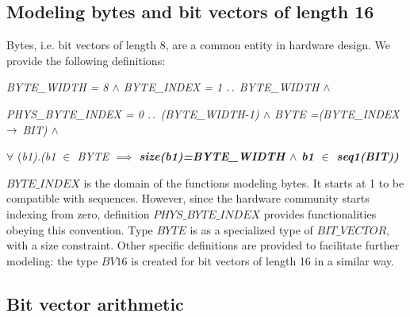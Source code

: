 \documentclass[a4paper]{llncs}
\begin{document}
\subsection{Modeling bytes and bit vectors of length 16}
\label{subsec:HardwareLibrary3}

Bytes, i.e. bit vectors of length 8, are a common entity in hardware
design. We provide the following definitions:

\hspace*{0.0in}\it BYTE\_WIDTH \rm = 8 $\land$ \it BYTE\_INDEX \rm = 1 $\mathbin{\ldotp\ldotp}$ \rm  BYTE\_WIDTH\rm  \hspace*{0.03in} $\land$

\hspace*{0.0in}\it PHYS\_BYTE\_INDEX \rm = \rm 0 $\mathbin{\ldotp\ldotp}$ \rm (\it BYTE\_WIDTH\rm -\rm 1\rm )\hspace*{0.03in} $\land$ \hspace*{0.0in}\it BYTE \rm =\rm (\it BYTE\_INDEX  $\rightarrow$  \it BIT\rm )\hspace*{0.0in} $\land$  


\hspace*{0.0in}$\forall$ \rm (\it b1\rm )\rm .\rm (\it b1  $\in$  \it BYTE  $\implies$  \bf size\rm (\it b1\rm )\rm =\it BYTE\_WIDTH  $\land$  \it b1  $\in$  \bf seq1\rm (\it BIT\rm )\rm ) 



$\textit{BYTE\_INDEX}$ is the domain of the functions modeling
bytes. It starts at 1 to be compatible with sequences. However, since
the hardware community starts indexing from zero, definition
$\textit{PHYS\_BYTE\_INDEX}$ provides functionalities obeying this
convention. Type $\textit{BYTE}$ is as a specialized type of
$\textit{BIT\_VECTOR}$, with a size constraint. Other specific
definitions are provided to facilitate further modeling: the type
$\textit{BV16}$ is created for bit vectors of length 16 in a similar
way.

\subsection{Bit vector arithmetic}
\label{subsec:Types}
 
\end{document}
